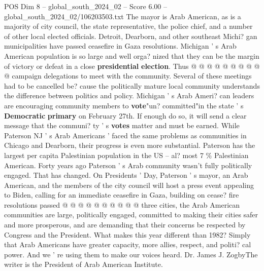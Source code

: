 \begin{textsample}{POS Dim 8 – global\_south\_2024\_02 – Score 6.00 – global\_south\_2024\_02/106203503.txt}
The mayor is Arab American, as is a majority of city council, the state representative, the police chief, and a number of other local elected officials.
Detroit, Dearborn, and other southeast Michi? gan municipalities have passed ceasefire in Gaza resolutions.
Michigan ' s Arab American population is so large and well orga? nized that they can be the margin of victory or defeat in a close \textbf{presidential} \textbf{election}.
Thus @ @ @ @ @ @ @ @ @ @ campaign delegations to meet with the community.
Several of these meetings had to be cancelled be? cause the politically mature local community understands the difference between politics and policy.
Michigan ' s Arab Ameri? can leaders are encouraging community members to \textbf{vote}"un? committed"in the state ' s \textbf{Democratic} \textbf{primary} on February 27th.
If enough do so, it will send a clear message that the communi? ty ' s \textbf{votes} matter and must be earned.
While Paterson NJ ' s Arab Americans ' faced the same problems as communities in Chicago and Dearborn, their progress is even more substantial.
Paterson has the largest per capita Palestinian population in the US -- al? most 7 \% Palestinian American.
Forty years ago Paterson ' s Arab community wasn't fully politically engaged.
That has changed.
On Presidents ' Day, Paterson ' s mayor, an Arab American, and the members of the city council will host a press event appealing to Biden, calling for an immediate ceasefire in Gaza, building on cease? fire resolutions passed @ @ @ @ @ @ @ @ @ @ three cities, the Arab American communities are large, politically engaged, committed to making their cities safer and more prosperous, and are demanding that their concerns be respected by Congress and the President.
What makes this year different than 1982?
Simply that Arab Americans have greater capacity, more allies, respect, and politi? cal power.
And we ' re using them to make our voices heard.
Dr.
James J.
ZogbyThe writer is the President of Arab American Institute.

\end{textsample}
